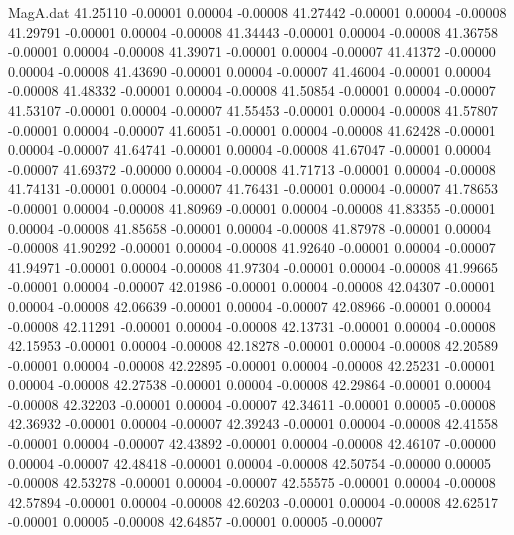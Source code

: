 \begin{filecontents}{MagA.dat}
  41.25110   -0.00001    0.00004   -0.00008
  41.27442   -0.00001    0.00004   -0.00008
  41.29791   -0.00001    0.00004   -0.00008
  41.34443   -0.00001    0.00004   -0.00008
  41.36758   -0.00001    0.00004   -0.00008
  41.39071   -0.00001    0.00004   -0.00007
  41.41372   -0.00000    0.00004   -0.00008
  41.43690   -0.00001    0.00004   -0.00007
  41.46004   -0.00001    0.00004   -0.00008
  41.48332   -0.00001    0.00004   -0.00008
  41.50854   -0.00001    0.00004   -0.00007
  41.53107   -0.00001    0.00004   -0.00007
  41.55453   -0.00001    0.00004   -0.00008
  41.57807   -0.00001    0.00004   -0.00007
  41.60051   -0.00001    0.00004   -0.00008
  41.62428   -0.00001    0.00004   -0.00007
  41.64741   -0.00001    0.00004   -0.00008
  41.67047   -0.00001    0.00004   -0.00007
  41.69372   -0.00000    0.00004   -0.00008
  41.71713   -0.00001    0.00004   -0.00008
  41.74131   -0.00001    0.00004   -0.00007
  41.76431   -0.00001    0.00004   -0.00007
  41.78653   -0.00001    0.00004   -0.00008
  41.80969   -0.00001    0.00004   -0.00008
  41.83355   -0.00001    0.00004   -0.00008
  41.85658   -0.00001    0.00004   -0.00008
  41.87978   -0.00001    0.00004   -0.00008
  41.90292   -0.00001    0.00004   -0.00008
  41.92640   -0.00001    0.00004   -0.00007
  41.94971   -0.00001    0.00004   -0.00008
  41.97304   -0.00001    0.00004   -0.00008
  41.99665   -0.00001    0.00004   -0.00007
  42.01986   -0.00001    0.00004   -0.00008
  42.04307   -0.00001    0.00004   -0.00008
  42.06639   -0.00001    0.00004   -0.00007
  42.08966   -0.00001    0.00004   -0.00008
  42.11291   -0.00001    0.00004   -0.00008
  42.13731   -0.00001    0.00004   -0.00008
  42.15953   -0.00001    0.00004   -0.00008
  42.18278   -0.00001    0.00004   -0.00008
  42.20589   -0.00001    0.00004   -0.00008
  42.22895   -0.00001    0.00004   -0.00008
  42.25231   -0.00001    0.00004   -0.00008
  42.27538   -0.00001    0.00004   -0.00008
  42.29864   -0.00001    0.00004   -0.00008
  42.32203   -0.00001    0.00004   -0.00007
  42.34611   -0.00001    0.00005   -0.00008
  42.36932   -0.00001    0.00004   -0.00007
  42.39243   -0.00001    0.00004   -0.00008
  42.41558   -0.00001    0.00004   -0.00007
  42.43892   -0.00001    0.00004   -0.00008
  42.46107   -0.00000    0.00004   -0.00007
  42.48418   -0.00001    0.00004   -0.00008
  42.50754   -0.00000    0.00005   -0.00008
  42.53278   -0.00001    0.00004   -0.00007
  42.55575   -0.00001    0.00004   -0.00008
  42.57894   -0.00001    0.00004   -0.00008
  42.60203   -0.00001    0.00004   -0.00008
  42.62517   -0.00001    0.00005   -0.00008
  42.64857   -0.00001    0.00005   -0.00007

\end{filecontents}
